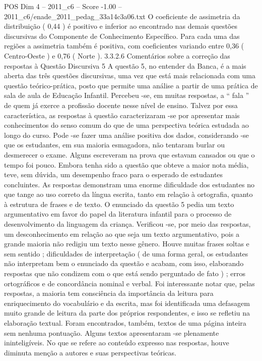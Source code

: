 \begin{textsample}{POS Dim 4 – 2011\_c6 – Score -1.00 – 2011\_c6/enade\_2011\_pedag\_33a14c3a06.txt}
O coeficiente de assimetria da distribuição ( 0,44 ) é positivo e inferior ao encontrado nas demais questões discursivas do Componente de Conhecimento Específico.
Para cada uma das regiões a assimetria também é positiva, com coeficientes variando entre 0,36 ( Centro-Oeste ) e 0,76 ( Norte ). 3.3.2.6 Comentários sobre a correção das respostas à Questão Discursiva 5 A questão 5, no entender da Banca, é a mais aberta das três questões discursivas, uma vez que está mais relacionada com uma questão teórico-prática, posto que permite uma análise a partir de uma prática de sala de aula de Educação Infantil.
Percebeu -se, em muitas respostas, a “ fala ” de quem já exerce a profissão docente nesse nível de ensino.
Talvez por essa característica, as respostas à questão caracterizaram -se por apresentar mais conhecimentos do senso comum do que de uma perspectiva teórica estudada ao longo do curso.
Pode -se fazer uma análise positiva dos dados, considerando -se que os estudantes, em sua maioria esmagadora, não tentaram burlar ou desmerecer o exame.
Alguns escreveram na prova que estavam cansados ou que o tempo foi pouco.
Embora tenha sido a questão que obteve a maior nota média, teve, sem dúvida, um desempenho fraco para o esperado de estudantes concluintes.
As respostas demonstram uma enorme dificuldade dos estudantes no que tange ao uso correto da língua escrita, tanto em relação à ortografia, quanto à estrutura de frases e de texto.
O enunciado da questão 5 pedia um texto argumentativo em favor do papel da literatura infantil para o processo de desenvolvimento da linguagem da criança.
Verificou -se, por meio das respostas, um desconhecimento em relação ao que seja um texto argumentativo, pois a grande maioria não redigiu um texto nesse gênero.
Houve muitas frases soltas e sem sentido ; dificuldades de interpretação ( de uma forma geral, os estudantes não interpretam bem o enunciado da questão e acabam, com isso, elaborando respostas que não condizem com o que está sendo perguntado de fato ) ; erros ortográficos e de concordância nominal e verbal.
Foi interessante notar que, pelas respostas, a maioria tem consciência da importância da leitura para enriquecimento do vocabulário e da escrita, mas foi identificada uma defasagem muito grande de leitura da parte dos próprios respondentes, e isso se refletiu na elaboração textual.
Foram encontrados, também, textos de uma página inteira sem nenhuma pontuação.
Alguns textos apresentaram -se plenamente ininteligíveis.
No que se refere ao conteúdo expresso nas respostas, houve diminuta menção a autores e suas perspectivas teóricas.

\end{textsample}
